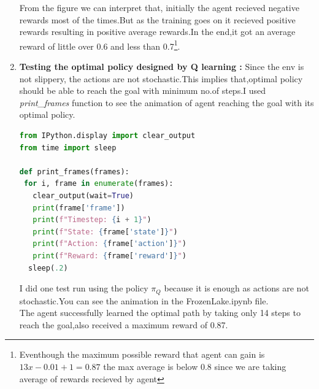 \documentclass[journal,12pt,onecolumn]{IEEEtran}
\theoremstyle{remark}
\numberwithin{equation}{section}
\begin{document}
\begin{enumerate}
  From the figure we can interpret that, initially the agent recieved negative rewards most of the times.But as the training goes on it recieved positive rewards resulting in positive average rewards.In the end,it got an average reward of little over 0.6 and less than 0.7\footnote{Eventhough the maximum possible reward that agent can gain is $13 x -0.01 + 1 = 0.87$ the max average is below 0.8 since we are taking average of rewards recieved by agent}.
\item \textbf{Testing the optimal policy designed by Q learning :} Since the env is not slippery, the actions are not stochastic.This implies that,optimal policy should be able to reach the goal with minimum no.of steps.I used \textit{print\_frames} function to see the animation of agent reaching the goal with its optimal policy.
	    \begin{lstlisting}[language = Python]
from IPython.display import clear_output
from time import sleep

def print_frames(frames):
 for i, frame in enumerate(frames):
   clear_output(wait=True)
   print(frame['frame'])
   print(f"Timestep: {i + 1}")
   print(f"State: {frame['state']}")
   print(f"Action: {frame['action']}")
   print(f"Reward: {frame['reward']}")
  sleep(.2)
	 \end{lstlisting}
 I did one test run using the policy $\pi_{Q}$ because it is enough as actions are not stochastic.You can see the animation in the FrozenLake.ipynb file.\\
     The agent successfully learned the optimal path by taking only 14 steps to reach the goal,also received a maximum reward of 0.87.
       \end{enumerate}
\end{document}
